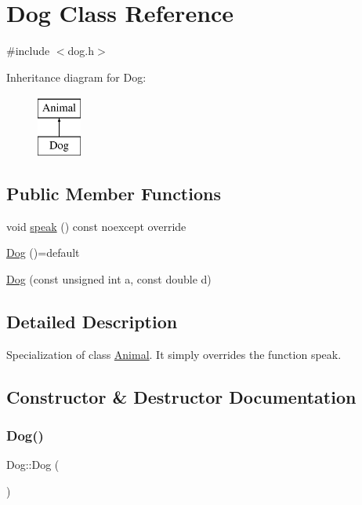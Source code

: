 \hypertarget{classDog}{}\section{Dog Class Reference}
\label{classDog}


{\ttfamily \#include $<$dog.\+h$>$}

Inheritance diagram for Dog\+:\begin{figure}[H]
\begin{center}
\leavevmode
\includegraphics[height=2.000000cm]{classDog}
\end{center}
\end{figure}
\subsection*{Public Member Functions}
\begin{DoxyCompactItemize}
\item 
void \hyperlink{classDog_a1b6e9a2b762fe5f905cb603789b59737}{speak} () const noexcept override
\item 
\hyperlink{classDog_a36b671ae98da1a176dd3fd295874c3ec}{Dog} ()=default
\item 
\hyperlink{classDog_a1b72afe034eb61f5de9af43a9c8dad6f}{Dog} (const unsigned int a, const double d)
\end{DoxyCompactItemize}


\subsection{Detailed Description}
Specialization of class \hyperlink{classAnimal}{Animal}. It simply overrides the function speak. 

\subsection{Constructor \& Destructor Documentation}
\mbox{\label{classDog_a36b671ae98da1a176dd3fd295874c3ec}} 
\subsubsection{\texorpdfstring{Dog()}{Dog()}\hspace{0.1cm}{\footnotesize\ttfamily [1/2]}}
{\footnotesize\ttfamily Dog\+::\+Dog (\begin{DoxyParamCaption}{ }\end{DoxyParamCaption})\hspace{0.3cm}{\ttfamily [default]}}

